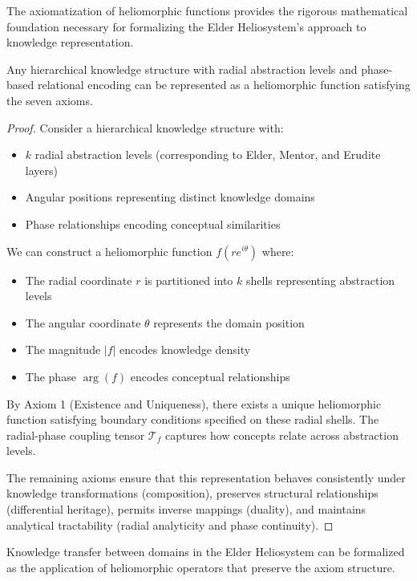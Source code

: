 The axiomatization of heliomorphic functions provides the rigorous mathematical foundation necessary for formalizing the Elder Heliosystem's approach to knowledge representation.

\begin{theorem}
Any hierarchical knowledge structure with radial abstraction levels and phase-based relational encoding can be represented as a heliomorphic function satisfying the seven axioms.
\end{theorem}

\begin{proof}
Consider a hierarchical knowledge structure with:
\begin{itemize}
    \item $k$ radial abstraction levels (corresponding to Elder, Mentor, and Erudite layers)
    \item Angular positions representing distinct knowledge domains
    \item Phase relationships encoding conceptual similarities
\end{itemize}

We can construct a heliomorphic function $f(re^{i\theta})$ where:
\begin{itemize}
    \item The radial coordinate $r$ is partitioned into $k$ shells representing abstraction levels
    \item The angular coordinate $\theta$ represents the domain position
    \item The magnitude $|f|$ encodes knowledge density
    \item The phase $\arg(f)$ encodes conceptual relationships
\end{itemize}

By Axiom 1 (Existence and Uniqueness), there exists a unique heliomorphic function satisfying boundary conditions specified on these radial shells. The radial-phase coupling tensor $\mathcal{T}_f$ captures how concepts relate across abstraction levels.

The remaining axioms ensure that this representation behaves consistently under knowledge transformations (composition), preserves structural relationships (differential heritage), permits inverse mappings (duality), and maintains analytical tractability (radial analyticity and phase continuity).
\end{proof}

\begin{corollary}
Knowledge transfer between domains in the Elder Heliosystem can be formalized as the application of heliomorphic operators that preserve the axiom structure.
\end{corollary}

